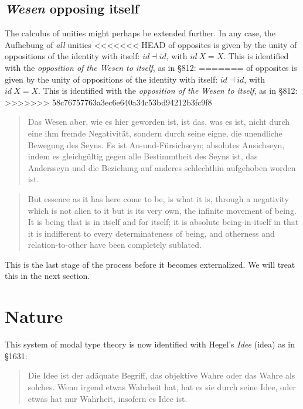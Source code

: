 \documentclass{article}
\begin{document}
\subsection{\emph{Wesen} opposing itself}\label{Wesen}
The calculus of unities might perhaps be extended further. In any case, the Aufhebung of \emph{all} unities
<<<<<<< HEAD
of opposites is given by the unity of oppositions of the identity with itself: $id\dashv id$, with $id\ X=X$.
This is identified with the \emph{opposition of the \emph{Wesen} to itself}, as in §812:
=======
of opposites is given by the unity of oppositions of the identity with itself: $id\dashv id$, with $id\
X=X$. This is identified with the \emph{opposition of the \emph{Wesen} to itself}, as in §812:
>>>>>>> 58c76757763a3ec6e640a34c53bd94212b3fc9f8

\begin{quote}
    Das Wesen aber, wie es hier geworden ist, ist das, was es ist, nicht durch eine ihm fremde Negativität,
sondern durch seine eigne, die unendliche Bewegung des Seyns. Es ist An-und-Fürsichseyn; absolutes Ansichseyn,
indem es gleichgültig gegen alle Bestimmtheit des Seyns ist, das Andersseyn und die Beziehung auf anderes
schlechthin aufgehoben worden ist.
\end{quote}

\begin{quote}
    But essence as it has here come to be, is what it is, through a negativity which is not alien to it
but is its very own, the infinite movement of being. It is being that is in itself and for itself; it
is absolute being-in-itself in that it is indifferent to every determinateness of being, and otherness
and relation-to-other have been completely sublated.
\end{quote}

This is the last stage of the process before it becomes externalized. We will treat this in the next section.



\section{Nature}
This system of modal type theory is now identified with Hegel's \emph{Idee} (idea) as in §1631:

\begin{quote}
    Die Idee ist der adäquate Begriff, das objektive Wahre oder das Wahre als solches. Wenn irgend etwas
Wahrheit hat, hat es sie durch seine Idee, oder etwas hat nur Wahrheit, insofern es Idee ist.
\end{quote}
\end{document}
